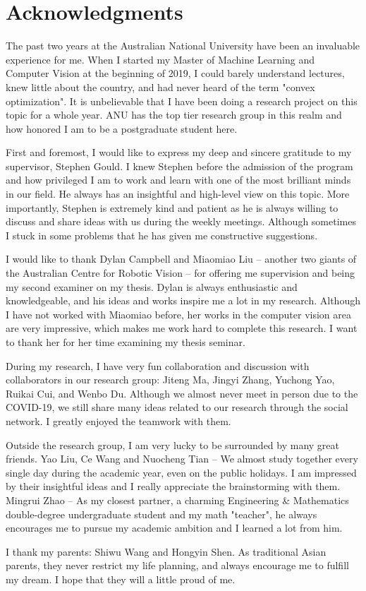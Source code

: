 \chapter*{Acknowledgments}
The past two years at the Australian National University have been an invaluable experience for me. When I started my Master of Machine Learning and Computer Vision at the beginning of 2019, I could barely understand lectures, knew little about the country, and had never heard of the term "convex optimization". It is unbelievable that I have been doing a research project on this topic for a whole year. ANU has the top tier research group in this realm and how honored I am to be a postgraduate student here. 
\par First and foremost, I would like to express my deep and sincere gratitude to my supervisor, Stephen Gould. I knew Stephen before the admission of the program and how privileged I am to work and learn with one of the most brilliant minds in our field. He always has an insightful and high-level view on this topic. More importantly, Stephen is extremely kind and patient as he is always willing to discuss and share ideas with us during the weekly meetings. Although sometimes I stuck in some problems that he has given me constructive suggestions. 
\par I would like to thank Dylan Campbell and Miaomiao Liu -- another two giants of the Australian Centre for Robotic Vision -- for offering me supervision and being my second examiner on my thesis. Dylan is always enthusiastic and knowledgeable, and his ideas and works inspire me a lot in my research. Although I have not worked with Miaomiao before, her works in the computer vision area are very impressive, which makes me work hard to complete this research. I want to thank her for her time examining my thesis seminar. 
\par During my research, I have very fun collaboration and discussion with collaborators in our research group: Jiteng Ma, Jingyi Zhang, Yuchong Yao, Ruikai Cui, and Wenbo Du. Although we almost never meet in person due to the COVID-19, we still share many ideas related to our research through the social network. I greatly enjoyed the teamwork with them.
\par Outside the research group, I am very lucky to be surrounded by many great friends. Yao Liu, Ce Wang and Nuocheng Tian -- We almost study together every single day during the academic year, even on the public holidays. I am impressed by their insightful ideas and I really appreciate the brainstorming with them. Mingrui Zhao -- As my closest partner, a charming Engineering \& Mathematics double-degree undergraduate student and my math "teacher", he always encourages me to pursue my academic ambition and I learned a lot from him. 
\par I thank my parents: Shiwu Wang and Hongyin Shen. As traditional Asian parents, they never restrict my life planning, and always encourage me to fulfill my dream. I hope that they will a little proud of me. 